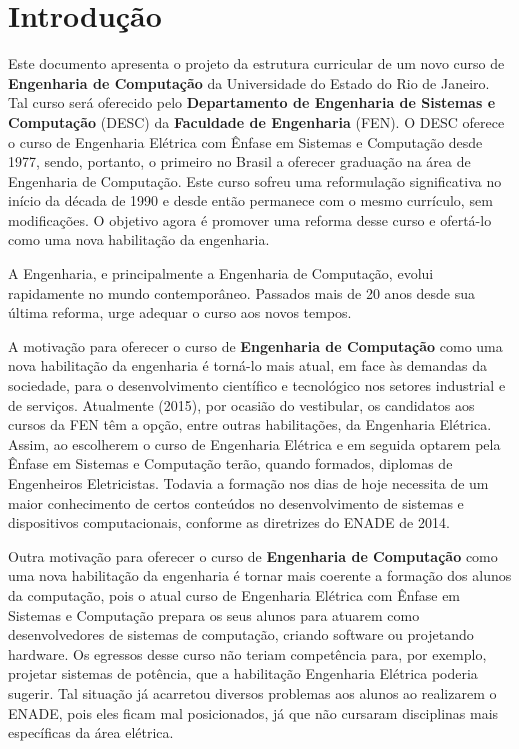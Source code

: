 %
%
%


\chapter{Introdução}
\label{intro} %

Este documento apresenta o projeto da estrutura curricular de um novo curso de \textbf{Engenharia de Computação} da Universidade do Estado do Rio de Janeiro. Tal curso será oferecido pelo \textbf{Departamento de Engenharia de Sistemas e Computação} (DESC) da \textbf{Faculdade de Engenharia} (FEN). O DESC oferece o curso de Engenharia Elétrica com Ênfase em Sistemas e Computação desde 1977, sendo, portanto, o primeiro no Brasil a oferecer graduação na área de Engenharia de Computação. Este curso sofreu uma reformulação significativa no início da década de 1990 e desde então permanece com o mesmo currículo, sem modificações. O objetivo agora é promover uma reforma desse curso e ofertá-lo como uma nova habilitação da engenharia.

A Engenharia, e principalmente a Engenharia de Computação, evolui rapidamente no mundo contemporâneo. Passados mais de 20 anos desde sua última reforma, urge adequar o curso aos novos tempos.

A motivação para oferecer o curso de \textbf{Engenharia de Computação} como uma nova habilitação da engenharia é torná-lo mais atual, em face às demandas da sociedade, para o desenvolvimento científico e tecnológico nos setores industrial e de serviços. Atualmente (2015), por ocasião do vestibular, os candidatos aos cursos da FEN têm a opção, entre outras habilitações, da Engenharia Elétrica. Assim, ao escolherem o curso de Engenharia Elétrica e em seguida optarem pela Ênfase em Sistemas e Computação terão, quando formados, diplomas de Engenheiros Eletricistas. Todavia a formação nos dias de hoje necessita de um maior conhecimento de certos conteúdos no desenvolvimento de sistemas e dispositivos computacionais, conforme as diretrizes do ENADE de 2014.

Outra motivação para oferecer o curso de \textbf{Engenharia de Computação} como uma nova habilitação da engenharia é tornar mais coerente a formação dos alunos da computação, pois o atual curso de Engenharia Elétrica com Ênfase em Sistemas e Computação prepara os seus alunos para atuarem como desenvolvedores  de sistemas de computação, criando software ou projetando hardware. Os egressos desse curso não teriam competência para, por exemplo, projetar sistemas de potência, que a habilitação Engenharia Elétrica poderia sugerir. Tal situação já acarretou diversos problemas aos alunos ao realizarem o ENADE, pois eles ficam mal posicionados, já que não cursaram disciplinas mais específicas da área elétrica.

